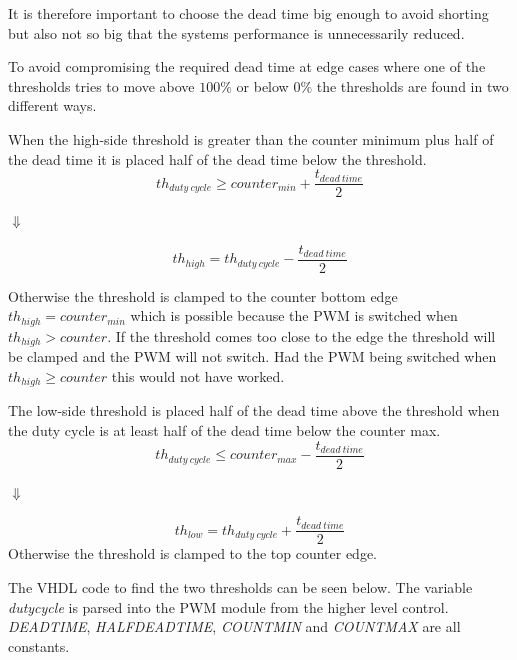 It is therefore important to choose the dead time big enough to avoid shorting but also not so big that the systems performance is unnecessarily reduced.

To avoid compromising the required dead time at edge cases where one of the thresholds tries to move above $100 \%$ or  below $0 \%$ the thresholds are found in two different ways.





When the high-side threshold is greater than the counter minimum plus half of the dead time it is placed half of the dead time below the threshold.
\begin{equation}
    th_{duty \ cycle} \geq  counter_{min} + \frac{t_{dead \ time}}{2}
    \label{eq:threshold_high_condition}
\end{equation}
\begin{center}
    $\Downarrow$    
\end{center}
\begin{equation}
   th_{high} = th_{duty \ cycle} - \frac{t_{dead \ time}}{2}  
   \label{eq:threshold_high_equation}
\end{equation}

Otherwise the threshold is clamped to the counter bottom edge $th_{high} = counter_{min}$ which is possible because the PWM is switched when $th_{high} > counter$.
If the threshold comes too close to the edge the threshold will be clamped and the PWM will not switch. Had the PWM being switched when $th_{high} \geq counter$ this would not have worked.



The low-side threshold is placed half of the dead time above the threshold when the duty cycle is at least half of the dead time below the counter max.
\begin{equation}
    th_{duty \ cycle}\leq counter_{max} - \frac{t_{dead \ time}}{2}
    \label{eq:threshold_low_condition}
\end{equation}
\begin{center}
    $\Downarrow$
\end{center}
\begin{equation}
  th_{low} = th_{duty \ cycle} + \frac{t_{dead \ time}}{2}  
  \label{eq:threshold_low_equation}
\end{equation}
Otherwise the threshold is clamped to the top counter edge.

The VHDL code to find the two thresholds can be seen below. The variable \textit{duty\textunderscore cycle} is parsed into the PWM module from the higher level control. \textit{DEADTIME}, \textit{HALF\textunderscore DEADTIME}, \textit{COUNT\textunderscore MIN} and \textit{COUNT\textunderscore MAX} are all constants.

